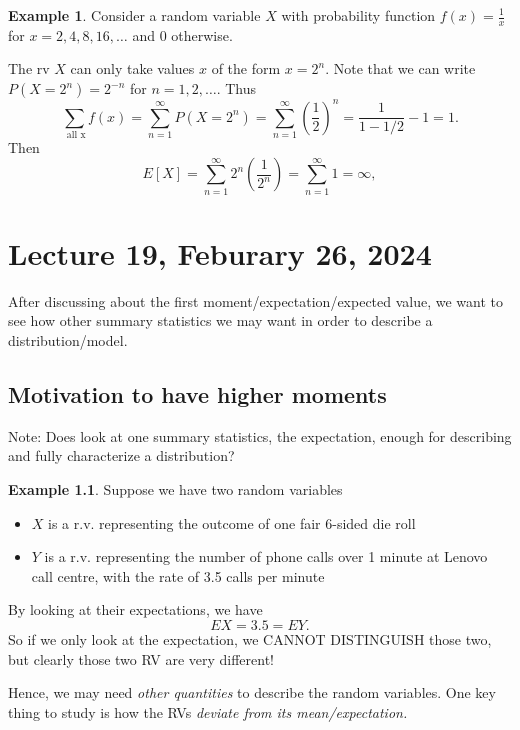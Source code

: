 \documentclass[
]{book}
\providecommand{\tightlist}{%
  \setlength{\itemsep}{0pt}\setlength{\parskip}{0pt}}
\theoremstyle{definition}
\theoremstyle{definition}
\newtheorem{example}{Example}[chapter]
\theoremstyle{definition}
\theoremstyle{definition}
\theoremstyle{remark}
\begin{document}
\begin{example}
Consider a random variable \(X\) with probability function \(f(x)=\frac{1}{x}\) for \(x=2, 4, 8, 16,\dots\) and 0 otherwise.

The rv \(X\) can only take values \(x\) of the form \(x=2^n\). Note that we can write \(P(X=2^n) = 2^{-n}\) for \(n=1,2,\dots\). Thus
\[\sum\limits_{\text{ all x}} f(x) = \sum_{n=1}^\infty P(X=2^n)= \sum_{n=1}^\infty \left(\frac{1}{2}\right)^n=\frac{1}{1-1/2} -1 = 1.\]
Then
\[ E[X] = \sum_{n=1}^\infty 2^n \left(\frac{1}{2^n}\right)=\sum_{n=1}^\infty 1 = \infty,\]
\end{example}

\chapter{Lecture 19, Feburary 26, 2024}\label{lecture-19-feburary-26-2024}

After discussing about the first moment/expectation/expected value, we want to see how other summary statistics we may want in order to describe a distribution/model.

\section{Motivation to have higher moments}\label{motivation-to-have-higher-moments}

Note: Does look at one summary statistics, the expectation, enough for describing and fully characterize a distribution?

\begin{example}
Suppose we have two random variables

\begin{itemize}
\tightlist
\item
  \(X\) is a r.v. representing the outcome of one fair 6-sided die roll
\item
  \(Y\) is a r.v. representing the number of phone calls over 1 minute at Lenovo call centre, with the rate of 3.5 calls per minute
\end{itemize}

By looking at their expectations, we have
\[
  E X = 3.5 = E Y.
\]
So if we only look at the expectation, we CANNOT DISTINGUISH those two, but clearly those two RV are very different!
\end{example}

Hence, we may need \emph{other quantities} to describe the random variables. One key thing to study is how the RVs \emph{deviate from its mean/expectation.}
\end{document}
